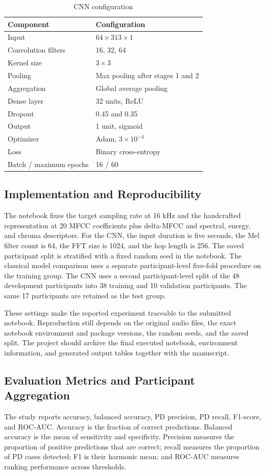 \documentclass[11pt,a4paper]{article}
\begin{document}
\begin{table}[!t]
\centering
\caption{CNN configuration}
\label{tab:cnn}
\begin{tabular}{ll}
\toprule
Component & Configuration\\
\midrule
Input & $64\times313\times1$\\
Convolution filters & 16, 32, 64\\
Kernel size & $3\times3$\\
Pooling & Max pooling after stages 1 and 2\\
Aggregation & Global average pooling\\
Dense layer & 32 units, ReLU\\
Dropout & 0.45 and 0.35\\
Output & 1 unit, sigmoid\\
Optimizer & Adam, $3\times10^{-4}$\\
Loss & Binary cross-entropy\\
Batch / maximum epochs & 16 / 60\\
\bottomrule
\end{tabular}
\end{table}


\subsection{Implementation and Reproducibility}
The notebook fixes the target sampling rate at 16 kHz and the handcrafted representation at 20 MFCC coefficients plus delta-MFCC and spectral, energy, and chroma descriptors. For the CNN, the input duration is five seconds, the Mel filter count is 64, the FFT size is 1024, and the hop length is 256. The saved participant split is stratified with a fixed random seed in the notebook. The classical model comparison uses a separate participant-level five-fold procedure on the training group. The CNN uses a second participant-level split of the 48 development participants into 38 training and 10 validation participants. The same 17 participants are retained as the test group.

These settings make the reported experiment traceable to the submitted notebook. Reproduction still depends on the original audio files, the exact notebook environment and package versions, the random seeds, and the saved split. The project should archive the final executed notebook, environment information, and generated output tables together with the manuscript.

\subsection{Evaluation Metrics and Participant Aggregation}
The study reports accuracy, balanced accuracy, PD precision, PD recall, F1-score, and ROC-AUC. Accuracy is the fraction of correct predictions. Balanced accuracy is the mean of sensitivity and specificity. Precision measures the proportion of positive predictions that are correct; recall measures the proportion of PD cases detected; F1 is their harmonic mean; and ROC-AUC measures ranking performance across thresholds.
\end{document}
